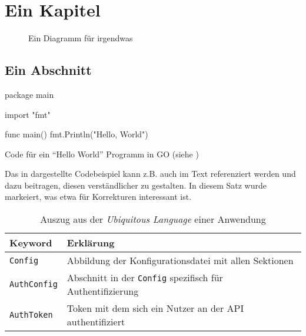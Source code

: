 \chapter{Ein Kapitel}
\blindtext[2]

\begin{figure}[H]
    \centering

    
    \caption{Ein Diagramm für irgendwas}
    \label{fig:irgendwas}
\end{figure}

\section{Ein Abschnitt}
\blindtext[4]

\begin{listing}[H]
    \begin{gocode}
        package main

        import "fmt"

        func main() {
            fmt.Println("Hello, World")
        }
    \end{gocode}
    
    \caption{Code für ein \enquote{Hello World} Programm in GO (siehe \cite{go:helloworld_playground})}
    \label{alg:go_helloworld}
\end{listing}

Das in  dargestellte Codebeispiel kann \ac{z.B.} auch im Text referenziert werden und dazu beitragen, diesen verständlicher zu gestalten.
In diesem Satz wurde  markeiert, was etwa für Korrekturen interessant ist.

\begin{table}
    \centering
    
    \settowidth{}
    \begin{tabulary}{\textwidth}{|L|L|} 
        \hline
        \textbf{Keyword} & \textbf{Erklärung} \\
        \hline
        \texttt{Config}  & Abbildung der Konfigurationsdatei mit allen Sektionen \\
        \hline
        \texttt{AuthConfig} & Abschnitt in der \texttt{Config} spezifisch für Authentifizierung \\
        \hline
        \texttt{AuthToken} & Token mit dem sich ein Nutzer an der API authentifiziert \\
        \hline
    \end{tabulary}

    \caption{Auszug aus der \emph{Ubiquitous Language} einer Anwendung}
    \label{tab:ubiquitous_language}
\end{table}